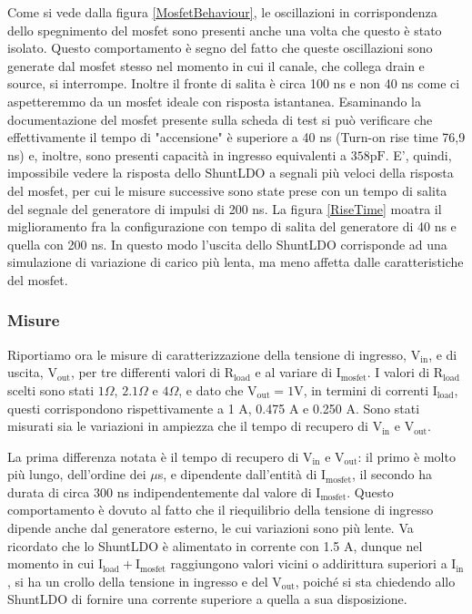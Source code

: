Come si vede dalla figura \ref{MosfetBehaviour}, le oscillazioni in corrispondenza dello spegnimento del mosfet sono presenti anche una volta che questo è stato isolato.
Questo comportamento è segno del fatto che queste oscillazioni sono generate dal mosfet stesso nel momento in cui il canale, che collega drain e source, si interrompe.
Inoltre il fronte di salita è circa 100 ns e non 40 ns come ci aspetteremmo da un mosfet ideale con risposta istantanea.
Esaminando la documentazione del mosfet presente sulla scheda di test 
si può verificare che effettivamente il tempo di "accensione" è superiore a 40 ns (Turn-on rise time 76,9 ns) e, inoltre, sono presenti capacità in ingresso equivalenti a $\mathrm{358 pF}$.
E', quindi, impossibile vedere la risposta dello ShuntLDO a segnali più veloci della risposta del mosfet, per cui le misure successive sono state prese con un tempo di salita del segnale del generatore di impulsi di 200 ns.
La figura \ref{RiseTime} moatra il miglioramento fra la configurazione con tempo di salita del generatore di 40 ns e quella con 200 ns.
In questo modo l'uscita dello ShuntLDO corrisponde ad una simulazione di variazione di carico più lenta, ma meno affetta dalle caratteristiche del mosfet.

\subsubsection{Misure}

Riportiamo ora le misure di caratterizzazione della tensione di ingresso, $\mathrm{V_{in}}$, e di uscita, $\mathrm{V_{out}}$, per tre differenti valori di $\mathrm{R_{load}}$ e al variare di $\mathrm{I_{mosfet}}$.
I valori di $\mathrm{R_{load}}$ scelti sono stati $1 \Omega$, $2.1 \Omega$ e $4 \Omega$, e dato che $\mathrm{V_{out}=1V}$, in termini di correnti  $\mathrm{I_{load}}$, questi corrispondono rispettivamente a 1 A, 0.475 A e 0.250 A.
Sono stati misurati sia le variazioni in ampiezza che il tempo di recupero di $\mathrm{V_{in}}$ e $\mathrm{V_{out}}$.

La prima differenza notata è il tempo di recupero di $\mathrm{V_{in}}$ e $\mathrm{V_{out}}$: il primo è molto più lungo, dell'ordine dei $\mu$s, e dipendente dall'entità di $\mathrm{I_{mosfet}}$, il secondo ha durata di circa 300 ns indipendentemente dal valore di $\mathrm{I_{mosfet}}$.
Questo comportamento è dovuto al fatto che il riequilibrio della tensione di ingresso dipende anche dal generatore esterno, le cui variazioni sono più lente.
Va ricordato che lo ShuntLDO è alimentato in corrente con 1.5 A, dunque nel momento in cui $\mathrm{I_{load}+I_{mosfet}}$ raggiungono valori vicini o addirittura superiori  a $\mathrm{I_{in}}$, si ha un crollo della tensione in ingresso e del $\mathrm{V_{out}}$, poiché si sta chiedendo allo ShuntLDO di fornire una corrente superiore a quella a sua disposizione.

